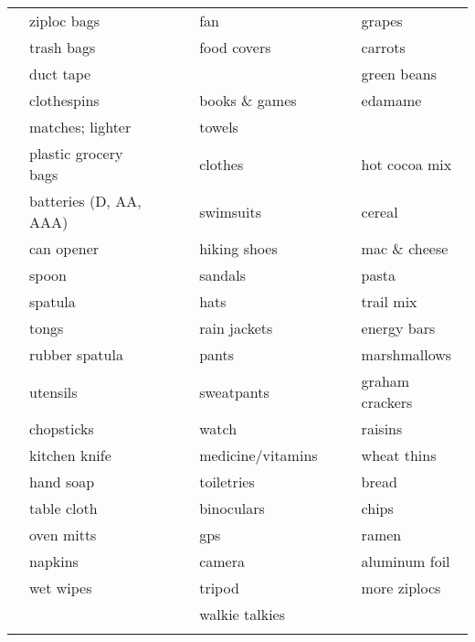 \documentclass[10pt]{article}
\newcommand{\mybox}{\framebox[4mm]{\textcolor{white} m} \framebox[4mm]{\textcolor{white} m} }
\begin{document}
\begin{tabular}{rlcrlcrl}
\mybox & ziploc bags            &    &\mybox & fan                  &      &\mybox & grapes \\
\mybox & trash bags             &    &\mybox & food covers          &      &\mybox & carrots \\
\mybox & duct tape              &    &\mybox &                      &      &\mybox & green beans \\ \cline{4-5}
\mybox & clothespins            &    &\mybox & books \& games       &      &\mybox & edamame \\
\mybox & matches; lighter       &    &\mybox & towels               &      &\mybox & \\ \cline{7-8}
\mybox & plastic grocery bags   &    &\mybox & clothes              &      &\mybox & hot cocoa mix  \\
\mybox & batteries (D, AA, AAA) &    &\mybox & swimsuits            &      &\mybox & cereal \\ \cline{1-2}
\mybox & can opener             &    &\mybox & hiking shoes         &      &\mybox & mac \& cheese \\ 
\mybox & spoon                  &    &\mybox & sandals              &      &\mybox & pasta \\
\mybox & spatula                &    &\mybox & hats                 &      &\mybox & trail mix \\   
\mybox & tongs                  &    &\mybox & rain jackets         &      &\mybox & energy bars \\ 
\mybox & rubber spatula         &    &\mybox & pants                &      &\mybox & marshmallows \\
\mybox & utensils               &    &\mybox & sweatpants           &      &\mybox & graham crackers \\
\mybox & chopsticks             &    &\mybox & watch                &      &\mybox & raisins \\
\mybox & kitchen knife          &    &\mybox & medicine/vitamins    &      &\mybox & wheat thins \\
\mybox & hand soap              &    &\mybox & toiletries           &      &\mybox & bread \\
\mybox & table cloth            &    &\mybox & binoculars           &      &\mybox & chips \\ \cline{4-5}
\mybox & oven mitts             &    &\mybox & gps                  &      &\mybox & ramen \\
\mybox & napkins                &    &\mybox & camera               &      &\mybox & aluminum foil \\
\mybox & wet wipes              &    &\mybox & tripod               &      &\mybox & more ziplocs \\
\mybox &                        &    &\mybox & walkie talkies       &      &\mybox & \\
\mybox & \hspace{1.5in}         &    &\mybox & \hspace{1.5in}       &      &\mybox & \hspace{1.5in} \\ \hline
\end{tabular} 
\end{document}
